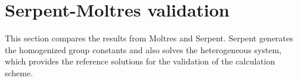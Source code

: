 \section{Serpent-Moltres validation}

This section compares the results from Moltres and Serpent.
Serpent generates the homogenized group constants and also solves the heterogeneous system, which provides the reference solutions for the validation of the calculation scheme.